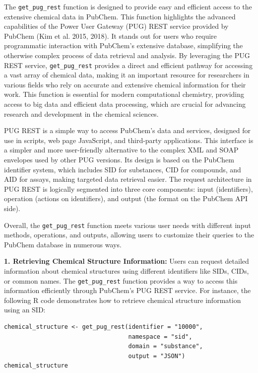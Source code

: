 The \texttt{get\_pug\_rest} function is designed to provide easy and efficient access to the extensive chemical data in PubChem. This function highlights the advanced capabilities of the Power User Gateway (PUG) REST service provided by PubChem (Kim et al. 2015, 2018). It stands out for users who require programmatic interaction with PubChem's extensive database, simplifying the otherwise complex process of data retrieval and analysis. By leveraging the PUG REST service, \texttt{get\_pug\_rest} provides a direct and efficient pathway for accessing a vast array of chemical data, making it an important resource for researchers in various fields who rely on accurate and extensive chemical information for their work. This function is essential for modern computational chemistry, providing access to big data and efficient data processing, which are crucial for advancing research and development in the chemical sciences.

PUG REST is a simple way to access PubChem's data and services, designed for use in scripts, web page JavaScript, and third-party applications. This interface is a simpler and more user-friendly alternative to the complex XML and SOAP envelopes used by other PUG versions. Its design is based on the PubChem identifier system, which includes SID for substances, CID for compounds, and AID for assays, making targeted data retrieval easier. The request architecture in PUG REST is logically segmented into three core components: input (identifiers), operation (actions on identifiers), and output (the format on the PubChem API side).

Overall, the \texttt{get\_pug\_rest} function meets various user needs with different input methods, operations, and outputs, allowing users to customize their queries to the PubChem database in numerous ways.

\textbf{1. Retrieving Chemical Structure Information:} Users can request detailed information about chemical structures using different identifiers like SIDs, CIDs, or common names. The \texttt{get\_pug\_rest} function provides a way to access this information efficiently through PubChem's PUG REST service. For instance, the following R code demonstrates how to retrieve chemical structure information using an SID:

\begin{verbatim}
chemical_structure <- get_pug_rest(identifier = "10000", 
                                   namespace = "sid", 
                                   domain = "substance", 
                                   output = "JSON")
chemical_structure
\end{verbatim}

